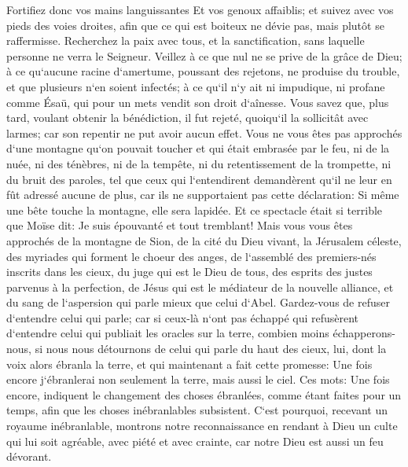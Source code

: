 \verse Fortifiez donc vos mains languissantes Et vos genoux affaiblis; 
\verse et suivez avec vos pieds des voies droites, afin que ce qui est boiteux ne dévie pas, mais plutôt se raffermisse. 
\verse Recherchez la paix avec tous, et la sanctification, sans laquelle personne ne verra le Seigneur. 
\verse Veillez à ce que nul ne se prive de la grâce de Dieu; à ce qu`aucune racine d`amertume, poussant des rejetons, ne produise du trouble, et que plusieurs n`en soient infectés; 
\verse à ce qu`il n`y ait ni impudique, ni profane comme Ésaü, qui pour un mets vendit son droit d`aînesse. 
\verse Vous savez que, plus tard, voulant obtenir la bénédiction, il fut rejeté, quoiqu`il la sollicitât avec larmes; car son repentir ne put avoir aucun effet. 
\verse Vous ne vous êtes pas approchés d`une montagne qu`on pouvait toucher et qui était embrasée par le feu, ni de la nuée, ni des ténèbres, ni de la tempête, 
\verse ni du retentissement de la trompette, ni du bruit des paroles, tel que ceux qui l`entendirent demandèrent qu`il ne leur en fût adressé aucune de plus, 
\verse car ils ne supportaient pas cette déclaration: Si même une bête touche la montagne, elle sera lapidée. 
\verse Et ce spectacle était si terrible que Moïse dit: Je suis épouvanté et tout tremblant! 
\verse Mais vous vous êtes approchés de la montagne de Sion, de la cité du Dieu vivant, la Jérusalem céleste, des myriades qui forment le choeur des anges, 
\verse de l`assemblé des premiers-nés inscrits dans les cieux, du juge qui est le Dieu de tous, des esprits des justes parvenus à la perfection, 
\verse de Jésus qui est le médiateur de la nouvelle alliance, et du sang de l`aspersion qui parle mieux que celui d`Abel. 
\verse Gardez-vous de refuser d`entendre celui qui parle; car si ceux-là n`ont pas échappé qui refusèrent d`entendre celui qui publiait les oracles sur la terre, combien moins échapperons-nous, si nous nous détournons de celui qui parle du haut des cieux, 
\verse lui, dont la voix alors ébranla la terre, et qui maintenant a fait cette promesse: Une fois encore j`ébranlerai non seulement la terre, mais aussi le ciel. 
\verse Ces mots: Une fois encore, indiquent le changement des choses ébranlées, comme étant faites pour un temps, afin que les choses inébranlables subsistent. 
\verse C`est pourquoi, recevant un royaume inébranlable, montrons notre reconnaissance en rendant à Dieu un culte qui lui soit agréable, 
\verse avec piété et avec crainte, car notre Dieu est aussi un feu dévorant. 

